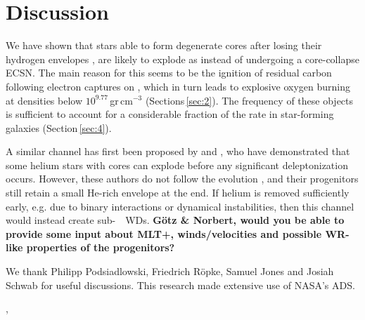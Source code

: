 \documentclass[twocolumn,tighten,times]{aastex62}
\begin{document}
\section{Discussion}\label{sec:5}
We have shown that stars able to form degenerate \one cores after losing 
their hydrogen  envelopes , are likely to explode 
as \ias instead of undergoing a core-collapse ECSN. The main reason for this seems to be the ignition of residual carbon following electron captures on , which in turn leads to explosive oxygen burning at densities below $10^{9.77}$\,gr\,cm$^{-3}$ (Sections\,\ref{sec:2}). 
The frequency of these objects is sufficient to account 
for a considerable fraction of the \ia  rate in 
star-forming galaxies (Section\,\ref{sec:4}). 

A similar \ia channel has first been proposed by \cite{waldman2006a} and \cite{waldman2008}, who have demonstrated that some helium stars with \one cores can explode before any significant deleptonization occurs. However, these authors do not follow the  evolution , and their progenitors still retain a small He-rich envelope at the end.  If helium is removed sufficiently early, e.g. due to binary interactions or dynamical instabilities, then this channel would instead create  sub-\mch\ \one\ WDs. 
{\bf G\"{o}tz \& Norbert, would you be able to provide some input about 
MLT+,  winds/velocities and possible WR-like properties of the progenitors?}



\acknowledgments
We thank Philipp Podsiadlowski, Friedrich R\"{o}pke,  Samuel Jones and Josiah Schwab for useful discussions.
%
 This research made extensive use of NASA's ADS.

,
           \citep{robert_farmer_2018_1441329}

 

\end{document}

